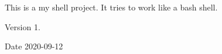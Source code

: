This is a my shell project. It tries to work like a bash shell.

\begin{DoxyVersion}{Version}
1. 
\end{DoxyVersion}
\begin{DoxyDate}{Date}
2020-\/09-\/12 
\end{DoxyDate}

